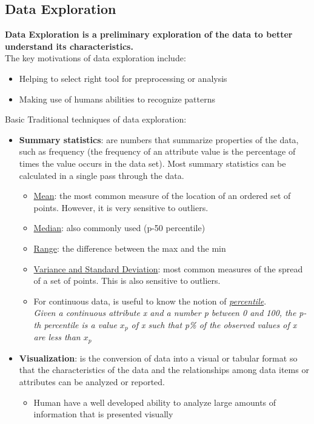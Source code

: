 \documentclass[10pt,a4paper]{article}
\begin{document}
\subsection{Data Exploration}
\textbf{Data Exploration is a preliminary exploration of the data to better understand its characteristics.}\\ The key motivations of data exploration include:
\begin{itemize}
	\item Helping to select right tool for preprocessing or analysis
	 \item Making use of humans abilities to recognize patterns
\end{itemize}
Basic Traditional techniques of data exploration:
\begin{itemize}
	\item \textbf{Summary statistics}: are numbers that summarize properties of the data, such as frequency (the frequency of an attribute value is the percentage of times the value occurs in the data set). Most summary statistics can be calculated in a single pass through the data.
	\begin{itemize}
		\item \uline{Mean}: the most common measure of the location of an ordered set of points. However, it is very sensitive to outliers.
		\item \uline{Median}: also commonly used (p-50 percentile)
		\item \uline{Range}: the difference between the max and the min
		\item \uline{Variance and Standard Deviation}: most common measures of the spread of a set of points. This is also sensitive to outliers.
		\item For continuous data, is useful to know the notion of \uline{\textit{percentile}}. \\ 
	\textit{Given a continuous attribute x and a number p between 0 and 100, the p-th percentile is a value $x_p$ of x such that p\% of the observed values of x are less than $x_p$} 
\end{itemize}	
	\item \textbf{Visualization}: is the conversion of data into a visual or tabular format so that the characteristics of the data and the relationships among data items or attributes can be analyzed or reported. 
	\begin{itemize}
			\item Human have a well developed ability to analyze large amounts of information that is presented visually

\end{itemize}
\end{itemize}
\end{document}
